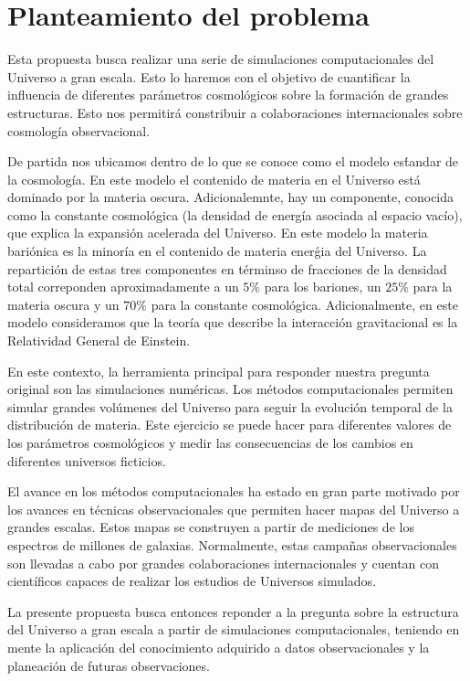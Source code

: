 

\section{Planteamiento del problema}

Esta propuesta busca realizar una serie de simulaciones
computacionales del Universo a gran escala. Esto lo haremos con el
objetivo de cuantificar la influencia de diferentes par\'ametros
cosmol\'ogicos sobre la formaci\'on de grandes estructuras. Esto nos
permitir\'a constribuir a colaboraciones internacionales sobre
cosmolog\'ia observacional. 

De partida nos ubicamos dentro de lo que se conoce como el modelo
es\'tandar de la cosmolog\'ia. En este modelo el contenido de materia
en el Universo est\'a dominado por la materia oscura. Adicionalemnte,
hay un componente, conocida como la constante cosmol\'ogica (la
densidad de energ\'ia asociada al espacio vac\'io), que explica la
expansi\'on acelerada del Universo. En este modelo la materia
bari\'onica es la minor\'ia en el contenido de materia ener\'gia del
Universo. La repartici\'on de estas tres componentes en t\'erminso de
fracciones de la densidad total correponden aproximadamente a un $5\%$
para los bariones, un $25\%$ para la materia oscura y un $70\%$ para
la constante cosmol\'ogica. Adicionalmente, en este modelo
consideramos que la teor\'ia que describe la interacci\'on
gravitacional es la Relatividad General de Einstein.

En este contexto, la herramienta principal para responder nuestra
pregunta original son las simulaciones num\'ericas. Los 
m\'etodos computacionales permiten simular grandes
vol\'umenes del Universo para seguir la evoluci\'on temporal de la
distribuci\'on de materia. Este ejercicio se puede hacer para
diferentes valores de los par\'ametros cosmol\'ogicos y 
medir las consecuencias de los cambios en diferentes universos
ficticios.  

El avance en los m\'etodos computacionales ha estado en gran parte
motivado por los avances en t\'ecnicas observacionales que permiten
hacer mapas del Universo a grandes escalas. Estos mapas se construyen
a partir de mediciones de los espectros de millones de
galaxias. Normalmente, estas campa\~nas observacionales son llevadas a
cabo por grandes colaboraciones internacionales y cuentan  con
cient\'ificos capaces de realizar los estudios de Universos simulados.

La presente propuesta busca entonces reponder a la pregunta sobre la
estructura del Universo a gran escala a partir de simulaciones
computacionales, teniendo en mente la aplicaci\'on del conocimiento
adquirido a datos observacionales y la planeaci\'on de futuras
observaciones. 
